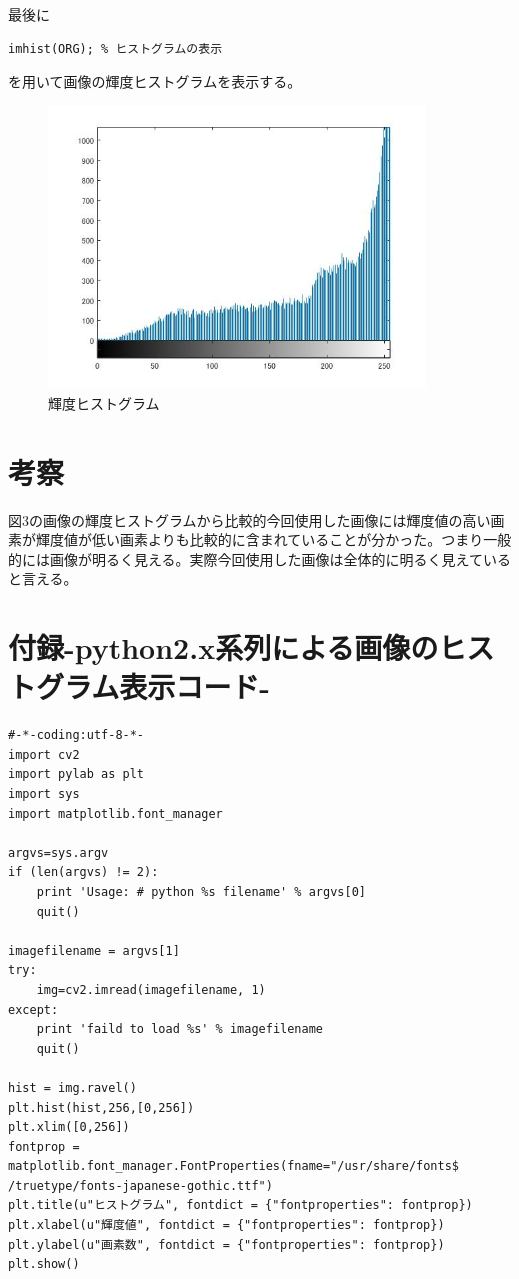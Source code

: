 \documentclass{jsarticle}
\begin{document}
最後に
\begin{lstlisting}[basicstyle=\ttfamily\footnotesize, frame=single]
imhist(ORG); % ヒストグラムの表示
 \end{lstlisting}
を用いて画像の輝度ヒストグラムを表示する。

\newpage
\begin{figure}[htbp]
 \begin{center}
  \includegraphics[width=10cm]{kadai4-1.jpg}
 \end{center}
 \caption{輝度ヒストグラム}
\end{figure}

\section{考察}
図3の画像の輝度ヒストグラムから比較的今回使用した画像には輝度値の高い画素が輝度値が低い画素よりも比較的に含まれていることが分かった。つまり一般的には画像が明るく見える。実際今回使用した画像は全体的に明るく見えていると言える。

\newpage
\section{付録-python2.x系列による画像のヒストグラム表示コード-}
\begin{lstlisting}[basicstyle=\ttfamily\footnotesize, frame=single]
#-*-coding:utf-8-*-
import cv2
import pylab as plt
import sys
import matplotlib.font_manager

argvs=sys.argv  
if (len(argvs) != 2):  
    print 'Usage: # python %s filename' % argvs[0]  
    quit()   
  
imagefilename = argvs[1]  
try:  
    img=cv2.imread(imagefilename, 1)  
except:  
    print 'faild to load %s' % imagefilename  
    quit() 

hist = img.ravel()
plt.hist(hist,256,[0,256])
plt.xlim([0,256])
fontprop = matplotlib.font_manager.FontProperties(fname="/usr/share/fonts$
/truetype/fonts-japanese-gothic.ttf")
plt.title(u"ヒストグラム", fontdict = {"fontproperties": fontprop})
plt.xlabel(u"輝度値", fontdict = {"fontproperties": fontprop})
plt.ylabel(u"画素数", fontdict = {"fontproperties": fontprop})
plt.show()
\end{lstlisting}
\end{document}
